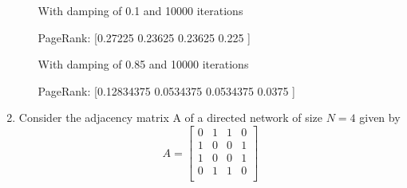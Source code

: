 \documentclass{amsart}
\theoremstyle{definition}
\theoremstyle{remark}
\numberwithin{equation}{section}
\begin{document}
\begin{enumerate}
\begin{enumerate}
With damping of 0.1 and 10000 iterations \vspace{0.2cm}

PageRank: [0.27225 0.23625 0.23625 0.225  ]

With damping of 0.85 and 10000 iterations \vspace{0.2cm}

PageRank: [0.12834375 0.0534375  0.0534375  0.0375    ]







\end{enumerate}
\clearpage

\item 
Consider the adjacency matrix A of a directed network of size $N = 4$ given by \vspace{0.2cm}
\begin{equation*}
{A}  = \left\lbrack\begin{array}{cccc}
0 & 1 & 1 & 0 \\
1 & 0 & 0 & 1 \\
1 & 0 & 0 & 1 \\
0 & 1 & 1 & 0 \\
\end{array}\right\rbrack
\end{equation*}


\end{enumerate}
\end{document}
